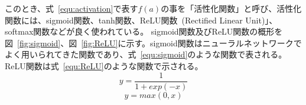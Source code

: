 このとき、式~\eqref{equ:activation}で表す$f(a)$の事を「活性化関数」と呼び、活性化関数には、sigmoid関数、tanh関数、ReLU関数~(Rectified Linear Unit)」、softmax関数などが良く使われている。
sigmoid関数及びReLU関数の概形を図~\ref{fig:sigmoid}、図~\ref{fig:ReLU}に示す。sigmoid関数はニューラルネットワークでよく用いられてきた関数であり、式~\eqref{equ:sigmoid}のような関数で表される。ReLU関数は式~\eqref{equ:ReLU}のような関数で示される。
\begin{equation}
    y = \frac{1}{1+exp(-x)}
    \label{equ:sigmoid}
\end{equation}
\begin{equation}
    y = max(0,x)
    \label{equ:ReLU}
\end{equation}

